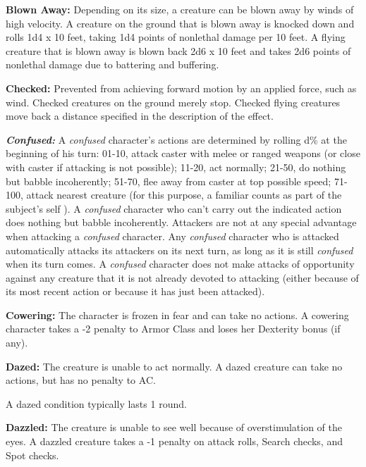 \documentclass{article}
\begin{document}
\vspace{12pt}
\textbf{Blown Away:} Depending on its size, a creature can be blown away by winds 
of high velocity. A creature on the ground that is blown away is knocked down and 
rolls 1d4 x 10 feet, taking 1d4 points of nonlethal damage per 10 feet. A flying 
creature that is blown away is blown back 2d6 x 10 feet and takes 2d6 points of 
nonlethal damage due to battering and buffering. 

\vspace{12pt}
\textbf{Checked:} Prevented from achieving forward motion by an applied force, 
such as wind. Checked creatures on the ground merely stop. Checked flying creatures 
move back a distance specified in the description of the effect.

\vspace{12pt}
\textit{\textbf{Confused:}}\textit{ }A \textit{confused }character's actions are 
determined by rolling d\% at the beginning of his turn: 01-10, attack caster with 
melee or ranged weapons (or close with caster if attacking is not possible); 11-20, 
act normally; 21-50, do nothing but babble incoherently; 51-70, flee away from 
caster at top possible speed; 71-100, attack nearest creature (for this purpose, 
a familiar counts as part of the subject's self ). A \textit{confused }character 
who can't carry out the indicated action does nothing but babble incoherently. 
Attackers are not at any special advantage when attacking a \textit{confused }character. 
Any \textit{confused }character who is attacked automatically attacks its attackers 
on its next turn, as long as it is still \textit{confused }when its turn comes. 
A \textit{confused }character does not make attacks of opportunity against any 
creature that it is not already devoted to attacking (either because of its most 
recent action or because it has just been attacked).

\vspace{12pt}
\textbf{Cowering: }The character is frozen in fear and can take no actions. A cowering 
character takes a -2 penalty to Armor Class and loses her Dexterity bonus (if any).

\vspace{12pt}
\textbf{Dazed:} The creature is unable to act normally. A dazed creature can take 
no actions, but has no penalty to AC.

A dazed condition typically lasts 1 round.

\vspace{12pt}
\textbf{Dazzled:} The creature is unable to see well because of overstimulation 
of the eyes. A dazzled creature takes a -1 penalty on attack rolls, Search checks, 
and Spot checks.
\end{document}
